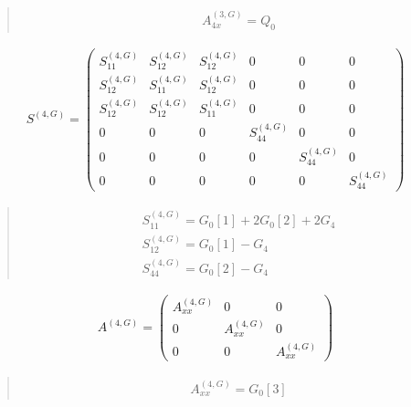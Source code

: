 \documentclass[fleqn,10pt]{jsarticle}
\begin{document}
\begin{quote}
\begin{align*}
& A^{(3,G)}_{4x} = Q_{0}
\end{align*}
\end{quote}
\begin{align*}
S^{(4,G)} = \begin{pmatrix} S^{(4,G)}_{11} & S^{(4,G)}_{12} & S^{(4,G)}_{12} & 0 & 0 & 0 \\ S^{(4,G)}_{12} & S^{(4,G)}_{11} & S^{(4,G)}_{12} & 0 & 0 & 0 \\ S^{(4,G)}_{12} & S^{(4,G)}_{12} & S^{(4,G)}_{11} & 0 & 0 & 0 \\ 0 & 0 & 0 & S^{(4,G)}_{44} & 0 & 0 \\ 0 & 0 & 0 & 0 & S^{(4,G)}_{44} & 0 \\ 0 & 0 & 0 & 0 & 0 & S^{(4,G)}_{44} \end{pmatrix}
\end{align*}
\begin{quote}
\begin{align*}
& S^{(4,G)}_{11} = G_{0}[1] + 2 G_{0}[2] + 2 G_{4} \\
& S^{(4,G)}_{12} = G_{0}[1] - G_{4} \\
& S^{(4,G)}_{44} = G_{0}[2] - G_{4}
\end{align*}
\end{quote}
\begin{align*}
A^{(4,G)} = \begin{pmatrix} A^{(4,G)}_{xx} & 0 & 0 \\ 0 & A^{(4,G)}_{xx} & 0 \\ 0 & 0 & A^{(4,G)}_{xx} \end{pmatrix}
\end{align*}
\begin{quote}
\begin{align*}
& A^{(4,G)}_{xx} = G_{0}[3]
\end{align*}
\end{quote}
\end{document}
